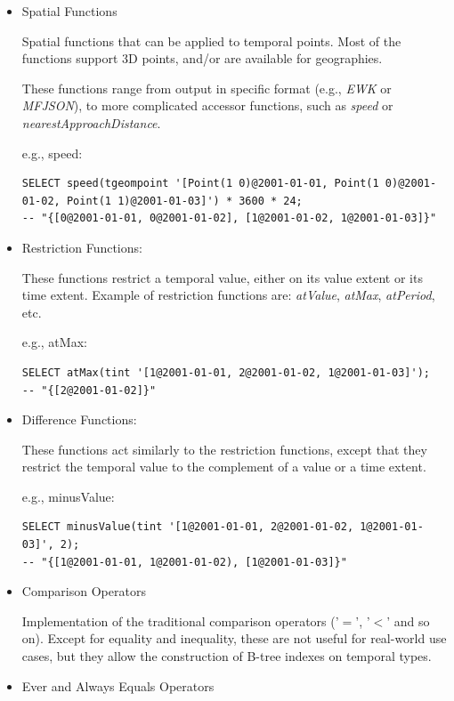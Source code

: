 \begin{itemize}
    \item Spatial Functions

        Spatial functions that can be applied to temporal points. Most of the functions support 3D points, and/or are available for geographies.

        These functions range from output in specific format (e.g., \textit{EWK} or \textit{MFJSON}), to more complicated accessor functions, such as \textit{speed} or \textit{nearestApproachDistance}.

        e.g., speed:
        \begin{lstlisting}
SELECT speed(tgeompoint '[Point(1 0)@2001-01-01, Point(1 0)@2001-01-02, Point(1 1)@2001-01-03]') * 3600 * 24;
-- "{[0@2001-01-01, 0@2001-01-02], [1@2001-01-02, 1@2001-01-03]}"
        \end{lstlisting}

    \item Restriction Functions:

        These functions restrict a temporal value, either on its value extent or its time extent.
        Example of restriction functions are: \textit{atValue}, \textit{atMax}, \textit{atPeriod}, etc.

        e.g., atMax:
        \begin{lstlisting}
SELECT atMax(tint '[1@2001-01-01, 2@2001-01-02, 1@2001-01-03]');
-- "{[2@2001-01-02]}"
        \end{lstlisting}

    \item Difference Functions:

        These functions act similarly to the restriction functions, except that they restrict the temporal value to the complement of a value or a time extent.

        e.g., minusValue:
        \begin{lstlisting}
SELECT minusValue(tint '[1@2001-01-01, 2@2001-01-02, 1@2001-01-03]', 2);
-- "{[1@2001-01-01, 1@2001-01-02), [1@2001-01-03]}"
        \end{lstlisting}

    \item Comparison Operators

        Implementation of the traditional comparison operators ('$=$', '$<$' and so on). Except for equality and inequality, these are not useful for real-world use cases, but they allow the construction of B-tree indexes on temporal types. 

    \item Ever and Always Equals Operators


\end{itemize}
